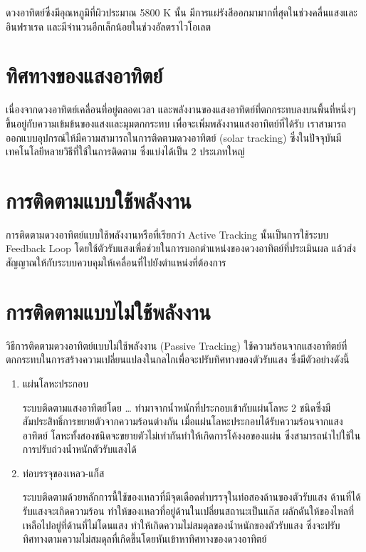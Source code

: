 \documentclass[a4paper,nobib,openany]{tufte-book}
\begin{document}
ดวงอาทิตย์ซึ่งมีอุณหภูมิที่ผิวประมาณ 5800 K นั้น
มีการแผ่รังสีออกมามากที่สุดในช่วงคลื่นแสงและอินฟราเรด
และมีจำนวนอีกเล็กน้อยในช่วงอัลตราไวโอเลต

\section{ทิศทางของแสงอาทิตย์}
\label{sec:orgb5e7100}
เนื่องจากดวงอาทิตย์เคลื่อนที่อยู่ตลอดเวลา
และพลังงานของแสงอาทิตย์ที่ตกกระทบลงบนพื้นที่หนึ่งๆขึ้นอยู่กับความเข้มข้นของแสงและมุมตกกระทบ
เพื่อจะเพิ่มพลังงานแสงอาทิตย์ที่ได้รับ
เราสามารถออกแบบอุปกรณ์ให้มีความสามารถในการติดตามดวงอาทิตย์ (solar
tracking) ซึ่งในปัจจุบันมีเทคโนโลยีหลายวิธีที่ใช้ในการติดตาม
ซึ่งแบ่งได้เป็น 2 ประเภทใหญ่

\section{การติดตามแบบใช้พลังงาน}
\label{sec:orge397b22}
การติดตามดวงอาทิตย์แบบใช้พลังงานหรือที่เรียกว่า Active Tracking
นั้นเป็นการใช้ระบบ Feedback Loop
โดยใช้ตัวรับแสงเพื่อช่วยในการบอกตำแหน่งของดวงอาทิตย์ที่ประเมินผล
แล้วส่งสัญญาณให้กับระบบควบคุมให้เคลื่อนที่ไปยังตำแหน่งที่ต้องการ

\section{การติดตามแบบไม่ใช้พลังงาน}
\label{sec:org3529699}
วิธีการติดตามดวงอาทิตย์แบบไม่ใช้พลังงาน (Passive Tracking)
ใช้ความร้อนจากแสงอาทิตย์ที่ตกกระทบในการสร้างความเปลี่ยนแปลงในกลไกเพื่อจะปรับทิศทางของตัวรับแสง
ซึ่งมีตัวอย่างดังนี้

\begin{enumerate}
\item แผ่นโลหะประกอบ

ระบบติดตามแสงอาทิตย์โดย \ldots{} ทำมาจากน้ำหนักที่ประกอบเข้ากับแผ่นโลหะ 2
ชนิดซึ่งมีสัมประสิทธิ์การขยายตัวจากความร้อนต่างกัน
เมื่อแผ่นโลหะประกอบได้รับความร้อนจากแสงอาทิตย์
โลหะทั้งสองชนิดจะขยายตัวไม่เท่ากันทำให้เกิดการโค้งงอของแผ่น
ซึ่งสามารถนำไปใช้ในการปรับถ่วงน้ำหนักตัวรับแสงได้

\item ท่อบรรจุของเหลว-แก็ส

ระบบติดตามด้วยหลักการนี้ใช้ของเหลวที่มีจุดเดือดต่ำบรรจุในท่อสองด้านของตัวรับแสง
ด้านที่ได้รับแสงจะเกิดความร้อน
ทำให้ของเหลวที่อยู่ด้านในเปลี่ยนสถานะเป็นแก๊ส
ผลักดันให้ของไหลที่เหลือไปอยู่ที่ด้านที่ไม่โดนแสง
ทำให้เกิดความไม่สมดุลของน้ำหนักของตัวรับแสง
ซึ่งจะปรับทิศทางตามความไม่สมดุลที่เกิดขึ้นโดยหันเข้าหาทิศทางของดวงอาทิตย์
\end{enumerate}
\end{document}
